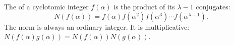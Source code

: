 The  of a cyclotomic integer $f(\alpha)$ is the product of its $\lambda-1$ conjugates:
$$N(f(\alpha)) = f(\alpha)f(\alpha^2)f(\alpha^3) \cdots f(\alpha^{\lambda-1}).$$
The norm is always an ordinary integer. It is multiplicative: $N(f(\alpha)g(\alpha)) = N(f(\alpha))N(g(\alpha))$.
